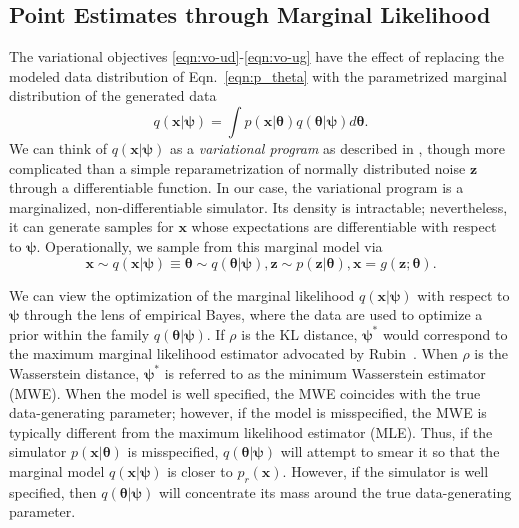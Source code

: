 \documentclass[twocolumn,superscriptaddress,aps]{revtex4-1}
\newcommand{\qxpsi}{q(\mathbf{x}|\bfpsi)}
\newcommand{\bftheta}{{\bm \theta}}
\newcommand{\bfpsi}{{\bm \psi}}
\newcommand{\bfx}{\mathbf{x}}
\newcommand{\bfz}{\mathbf{z}}
\theoremstyle{plain}
\begin{document}
\subsection{Point Estimates through Marginal Likelihood}

The variational objectives \ref{eqn:vo-ud}-\ref{eqn:vo-ug}
have the effect of replacing the modeled data distribution of Eqn.~\ref{eqn:p_theta} with
the parametrized marginal distribution of the generated data
\begin{equation}\label{eq:marginal_likelihood}
    \qxpsi = \int  p(\mathbf{x}|\bftheta) q(\bftheta|\bfpsi) d\bftheta.
\end{equation}
We can think of $q(\bfx|\bfpsi)$ as a \textit{variational program} as described
in \citep{2016arXiv161009033R}, though more complicated than a simple
reparametrization of normally distributed noise $\bfz$ through a differentiable
function. In our case, the variational program is a
marginalized, non-differentiable  simulator.  Its density is  intractable;
nevertheless, it can generate samples for $\bfx$ whose expectations are differentiable with
respect to $\bfpsi$.
Operationally, we sample from this marginal model via
\begin{equation}\label{eqn:p_psi}
    \mathbf{x} \sim \qxpsi \equiv \bftheta \sim q(\bftheta|\bfpsi), \bfz \sim p(\bfz|\bftheta), \mathbf{x} = g(\bfz; \bftheta).
\end{equation}

We can view the optimization of the marginal likelihood $q(\bfx | \bfpsi)$ with respect to $\bfpsi$ through the lens of empirical Bayes, where the data are used to optimize a prior within the family $q(\bftheta|\bfpsi)$. If $\rho$ is the KL distance, $\bfpsi^*$ would correspond to the maximum marginal likelihood estimator advocated by Rubin~\citep{rubin1984}.
When $\rho$ is the Wasserstein distance, $\bfpsi^*$ is referred to as the
minimum Wasserstein estimator (MWE).
When the model is well specified, the MWE
coincides with the true data-generating parameter; however, if the model is
misspecified, the MWE is typically different from the maximum likelihood
estimator (MLE).
Thus, if the simulator $p(\bfx |
\bftheta)$ is misspecified, $q(\bftheta | \bfpsi)$ will attempt to smear it so that the marginal
model $q(\bfx | \bfpsi)$ is closer to $p_r(\bfx)$. However, if the simulator is well specified,
then $q(\bftheta | \bfpsi)$ will concentrate its mass around the true data-generating parameter.
\end{document}
